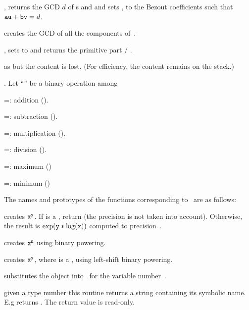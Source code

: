 , returns the GCD $d$ of
s  and  and sets ,  to the Bezout
coefficients such that ${\tt au} + {\tt bv} = d$.

 creates the GCD of all the components of~.

, sets  to 
and returns the primitive part  / .

 as  but the content is lost.
(For efficiency, the content remains on the stack.)

. Let ``\op'' be a binary operation among

\op=: addition ().

\op=: subtraction ().

\op=: multiplication ().

\op=: division ().

\op=: maximum ()

\op=: minimum ()

\noindent The names and prototypes of the functions corresponding
to \op\ are as follows:




 creates ${\tt x}^{{\tt y}}$. If
 is a , return  (the precision  is not
taken into account). Otherwise, the result is $\exp({\tt y}*\log({\tt x}))$
computed to precision~.

 creates ${\tt x}^{{\tt n}}$ using
binary powering.

 creates ${\tt x}^{{\tt y}}$, where  is a
, using left-shift binary powering.


 substitutes the object 
into~ for the variable number~.


 given a type number  this routine
returns a string containing its symbolic name. E.g 
returns . The return value is read-only.

